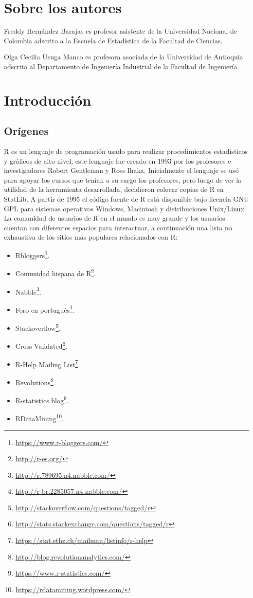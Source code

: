 \documentclass[
]{book}
\providecommand{\tightlist}{%
  \setlength{\itemsep}{0pt}\setlength{\parskip}{0pt}}
\renewcommand{\href}[2]{#2\footnote{\url{#1}}}
\begin{document}
\hypertarget{sobre-los-autores}{%
\chapter*{Sobre los autores}\label{sobre-los-autores}}

Freddy Hernández Barajas es profesor asistente de la Universidad Nacional de Colombia adscrito a la Escuela de Estadística de la Facultad de Ciencias.

Olga Cecilia Usuga Manco es profesora asociada de la Universidad de Antioquia adscrita al Departamento de Ingeniería Industrial de la Facultad de Ingeniería.

\hypertarget{intro}{%
\chapter{Introducción}\label{intro}}

\hypertarget{oruxedgenes}{%
\section{Orígenes}\label{oruxedgenes}}

R es un lenguaje de programación usado para realizar procedimientos estadísticos y gráficos de alto nivel, este lenguaje fue creado en 1993 por los profesores e investigadores Robert Gentleman y Ross Ihaka. Inicialmente el lenguaje se usó para apoyar los cursos que tenían a su cargo los profesores, pero luego de ver la utilidad de la herramienta desarrollada, decidieron colocar copias de R en StatLib. A partir de 1995 el código fuente de R está disponible bajo licencia GNU GPL para sistemas operativos Windows, Macintosh y distribuciones Unix/Linux. La comunidad de usuarios de R en el mundo es muy grande y los usuarios cuentan con diferentes espacios para interactuar, a continuación una lista no exhaustiva de los sitios más populares relacionados con R:

\begin{itemize}
\tightlist
\item
  \href{https://www.r-bloggers.com/}{Rbloggers}.
\item
  \href{http://r-es.org/}{Comunidad hispana de R}.
\item
  \href{http://r.789695.n4.nabble.com/}{Nabble}.
\item
  \href{http://r-br.2285057.n4.nabble.com/}{Foro en portugués}.
\item
  \href{http://stackoverflow.com/questions/tagged/r}{Stackoverflow}.
\item
  \href{http://stats.stackexchange.com/questions/tagged/r}{Cross Validated}.
\item
  \href{https://stat.ethz.ch/mailman/listinfo/r-help}{R-Help Mailing List}.
\item
  \href{http://blog.revolutionanalytics.com/}{Revolutions}.
\item
  \href{https://www.r-statistics.com/}{R-statistics blog}.
\item
  \href{https://rdatamining.wordpress.com/}{RDataMining}.
\end{itemize}
\end{document}
